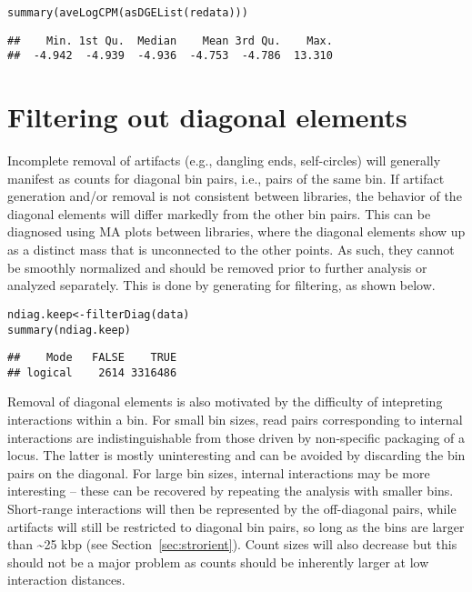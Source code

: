 \documentclass{report}\usepackage[]{graphicx}\usepackage[usenames,dvipsnames]{color}
\newcommand{\hlstd}[1]{\textcolor[rgb]{0.251,0.251,0.251}{#1}}%
\newcommand{\hlkwb}[1]{\textcolor[rgb]{0,0,0}{#1}}%
\newcommand{\hlkwd}[1]{\textcolor[rgb]{0.878,0.439,0.125}{#1}}%
\newenvironment{knitrout}{}{} %
\begin{document}
\begin{knitrout}
\color{fgcolor}\begin{kframe}
\begin{alltt}
\hlkwd{summary}\hlstd{(}\hlkwd{aveLogCPM}\hlstd{(}\hlkwd{asDGEList}\hlstd{(redata)))}
\end{alltt}
\begin{verbatim}
##    Min. 1st Qu.  Median    Mean 3rd Qu.    Max. 
##  -4.942  -4.939  -4.936  -4.753  -4.786  13.310
\end{verbatim}
\end{kframe}
\end{knitrout}

\section{Filtering out diagonal elements}
Incomplete removal of artifacts (e.g., dangling ends, self-circles) will generally manifest as counts for diagonal bin pairs, i.e., pairs of the same bin.
If artifact generation and/or removal is not consistent between libraries, the behavior of the diagonal elements will differ markedly from the other bin pairs.
This can be diagnosed using MA plots between libraries, where the diagonal elements show up as a distinct mass that is unconnected to the other points.
As such, they cannot be smoothly normalized and should be removed prior to further analysis or analyzed separately.
This is done by generating  for filtering, as shown below.

\begin{knitrout}
\color{fgcolor}\begin{kframe}
\begin{alltt}
\hlstd{ndiag.keep} \hlkwb{<-} \hlkwd{filterDiag}\hlstd{(data)}
\hlkwd{summary}\hlstd{(ndiag.keep)}
\end{alltt}
\begin{verbatim}
##    Mode   FALSE    TRUE 
## logical    2614 3316486
\end{verbatim}
\end{kframe}
\end{knitrout}

Removal of diagonal elements is also motivated by the difficulty of intepreting interactions within a bin.
For small bin sizes, read pairs corresponding to internal interactions are indistinguishable from those driven by non-specific packaging of a locus.
The latter is mostly uninteresting and can be avoided by discarding the bin pairs on the diagonal.
For large bin sizes, internal interactions may be more interesting -- these can be recovered by repeating the analysis with smaller bins.
Short-range interactions will then be represented by the off-diagonal pairs, while artifacts will still be restricted to diagonal bin pairs, so long as the bins are larger than \textasciitilde{}25 kbp (see Section~\ref{sec:strorient}).
Count sizes will also decrease but this should not be a major problem as counts should be inherently larger at low interaction distances. 
\end{document}
